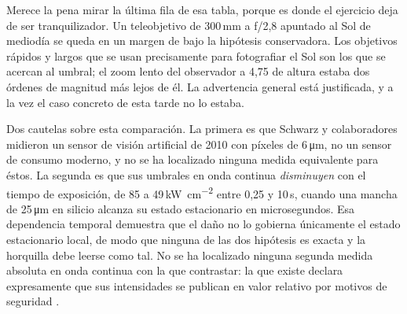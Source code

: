 \documentclass[10pt,a4paper]{article}
\begin{document}


Merece la pena mirar la última fila de esa tabla, porque es donde el ejercicio
deja de ser tranquilizador. Un teleobjetivo de 300\,mm a f/2,8 apuntado al Sol
de mediodía se queda en un margen de \marginFast{} bajo la hipótesis
conservadora. Los objetivos rápidos y largos que se usan precisamente para
fotografiar el Sol son los que se acercan al umbral; el zoom lento del observador
a 4,75\textdegree{} de altura estaba dos órdenes de magnitud más lejos de él. La
advertencia general está justificada, y a la vez el caso concreto de esta tarde
no lo estaba.

Dos cautelas sobre esta comparación. La primera es que Schwarz y colaboradores
midieron un sensor de visión artificial de 2010 con píxeles de
6\,\si{\micro\meter}, no un sensor de consumo moderno, y no se ha localizado
ninguna medida equivalente para éstos. La segunda es que sus umbrales en onda
continua \emph{disminuyen} con el tiempo de exposición, de 85 a
49\,\si{\kilo\watt\per\square\centi\meter} entre 0,25 y 10\,s, cuando una mancha
de 25\,\si{\micro\meter} en silicio alcanza su estado estacionario en microsegundos.
Esa dependencia temporal demuestra que el daño no lo gobierna únicamente el
estado estacionario local, de modo que ninguna de las dos hipótesis es exacta y
la horquilla debe leerse como tal. No se ha localizado ninguna segunda medida
absoluta en onda continua con la que contrastar: la que existe declara
expresamente que sus intensidades se publican en valor relativo por motivos de
seguridad \cite{yoon2016}.
\end{document}
